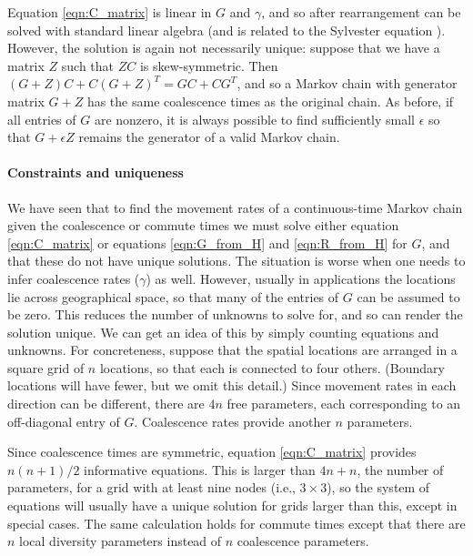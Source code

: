 \documentclass{article}
\begin{document}
Equation \eqref{eqn:C_matrix} is linear in $G$ and $\gamma$,
and so after rearrangement can be solved with standard linear algebra
(and is related to the Sylvester equation \citep{bhatia1997solve}).
However, the solution is again not necessarily unique:
suppose that we have a matrix $Z$ such that $ZC$ is skew-symmetric.
Then $(G + Z) C + C (G + Z)^T = GC + CG^T$,
and so a Markov chain with generator matrix $G + Z$ has the same coalescence times
as the original chain.
As before, if all entries of $G$ are nonzero, 
it is always possible to find sufficiently small $\epsilon$
so that $G + \epsilon Z$ remains the generator of a valid Markov chain.

\paragraph{Constraints and uniqueness}
We have seen that to find the movement rates of a continuous-time Markov chain
given the coalescence or commute times
we must solve either equation \eqref{eqn:C_matrix} 
or equations \eqref{eqn:G_from_H} and \eqref{eqn:R_from_H} for $G$,
and that these do not have unique solutions.
The situation is worse when one needs to infer coalescence rates ($\gamma$) as well.
However, usually in applications the locations lie across geographical space,
so that many of the entries of $G$ can be assumed to be zero.
This reduces the number of unknowns to solve for,
and so can render the solution unique.
We can get an idea of this by simply counting equations and unknowns.
For concreteness, suppose that the spatial locations
are arranged in a square grid of $n$ locations,
so that each is connected to four others.
(Boundary locations will have fewer, but we omit this detail.)
Since movement rates in each direction can be different,
there are $4n$ free parameters, each corresponding to an off-diagonal entry of $G$.
Coalescence rates provide another $n$ parameters.

Since coalescence times are symmetric, 
equation \eqref{eqn:C_matrix} provides $n (n+1)/2$ informative equations.
This is larger than $4n+n$, the number of parameters,
for a grid with at least nine nodes (i.e., $3 \times 3$),
so the system of equations will usually have a unique solution
for grids larger than this, except in special cases.
The same calculation holds for commute times 
except that there are $n$ local diversity parameters instead of $n$ coalescence parameters.
\end{document}
